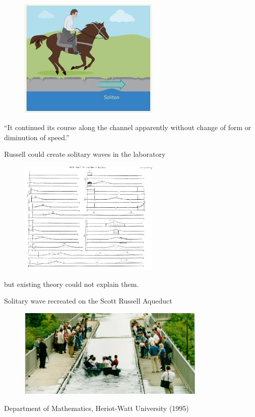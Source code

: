 \documentclass[16pt]{beamer}
\begin{document}
\begin{frame}
\fontsize{18}{7.2}\selectfont
\begin{figure}[H]
\centering
\includegraphics[width=0.6\textwidth]{images/horsebefore.jpg}
\end{figure}
``It continued its course along the channel apparently without change of form or diminution of speed.''
\end{frame}

\begin{frame}
\fontsize{18}{7.2}\selectfont
Russell could create solitary waves in the laboratory
\begin{figure}[H]
\centering
\includegraphics[width=0.6\textwidth]{images/russellwaves.jpg}
\end{figure}
but existing theory could not explain them.
\end{frame}

\begin{frame}
\fontsize{18}{7.2}\selectfont
Solitary wave recreated on the Scott Russell Aqueduct
\begin{figure}[H]
\centering
\includegraphics[width=0.8\textwidth]{images/watersoliton.png}
\end{figure}
Department of Mathematics, Heriot-Watt University (1995)
\end{frame}
\end{document}
